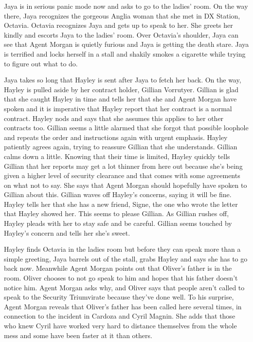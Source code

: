 Jaya is in serious panic mode now and asks to go to the ladies' room.  On the way there, Jaya recognizes the gorgeous Anglia woman that she met in DX Station, Octavia.  Octavia recognizes Jaya and gets up to speak to her.  She greets her kindly and escorts Jaya to the ladies' room.  Over Octavia's shoulder, Jaya can see that Agent Morgan is quietly furious and Jaya is getting the death stare.  Jaya is terrified and locks herself in a stall and shakily smokes a cigarette while trying to figure out what to do.  



Jaya takes so long that Hayley is sent after Jaya to fetch her back.  On the way, Hayley is pulled aside by her contract holder, Gillian Vorrutyer. Gillian is glad that she caught Hayley in time and tells her that she and Agent Morgan have spoken and it is imperative that Hayley report that her contract is a normal contract.  Hayley nods and says that she assumes this applies to her other contracts too.  Gillian seems a little alarmed that she forgot that possible loophole and repeats the order and instructions again with urgent emphasis.  Hayley patiently agrees again, trying to reassure Gillian that she understands.  Gillian calms down a little.  Knowing that their time is limited, Hayley quickly tells Gillian that her reports may get a lot thinner from here out because she's being given a higher level of security clearance and that comes with some agreements on what not to say.  She says that Agent Morgan should hopefully have spoken to Gillian about this.  Gillian waves off Hayley's concerns, saying it will be fine.  Hayley tells her that she has a new friend, Signe, the one who wrote the letter that Hayley showed her.  This seems to please Gillian.  As Gillian rushes off, Hayley pleads with her to stay safe and be careful.  Gillian seems touched by Hayley's concern and tells her she's sweet.



Hayley finds Octavia in the ladies room but before they can speak more than a simple greeting, Jaya barrels out of the stall, grabs Hayley and says she has to go back now.  Meanwhile Agent Morgan points out that Oliver's father is in the room.  Oliver chooses to not go speak to him and hopes that his father doesn't notice him.  Agent Morgan asks why, and Oliver says that people aren't called to speak to the Security Triumvirate because they've done well.  To his surprise, Agent Morgan reveals that Oliver's father has been called here several times, in connection to the incident in Cardoza and Cyril Magnin.  She adds that those who knew Cyril have worked very hard to distance themselves from the whole mess and some have been faster at it than others.



